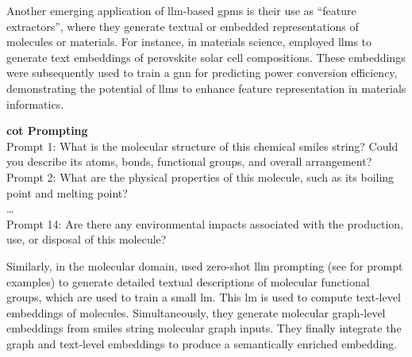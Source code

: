 
Another emerging application of \gls{llm}-based \glspl{gpm} is their use as \enquote{feature extractors}, where they generate textual or embedded representations of molecules or materials. For instance, in materials science, \textcite{aneesh2025semantic} employed \glspl{llm} to generate text embeddings of perovskite solar cell compositions. 
These embeddings were subsequently used to train a \gls{gnn} for predicting power conversion efficiency, demonstrating the potential of \glspl{llm} to enhance feature representation in materials informatics. 
\begin{promptbox}[label={box: cot_prompting}]
    \textbf{\gls{cot} Prompting}\autocite{srinivas2024crossmodal}\\
    Prompt 1: What is the molecular structure of this chemical \gls{smiles} string? Could you describe its atoms, bonds, functional groups, and overall arrangement? \\
    Prompt 2: What are the physical properties of this molecule, such as its boiling point and melting point?\\
    \dots\\
    Prompt 14: Are there any environmental impacts associated with the production, use, or disposal of this molecule?
\end{promptbox}
Similarly, in the molecular domain, \textcite{srinivas2024crossmodal} used zero-shot \gls{llm} prompting (see  for prompt examples) to generate detailed textual descriptions of molecular functional groups, which are used to train a small \gls{lm}. This \gls{lm} is used to compute text-level embeddings of molecules. Simultaneously, they generate molecular graph-level embeddings from \gls{smiles} string molecular graph inputs. They finally integrate the graph and text-level embeddings to produce a semantically enriched embedding.


